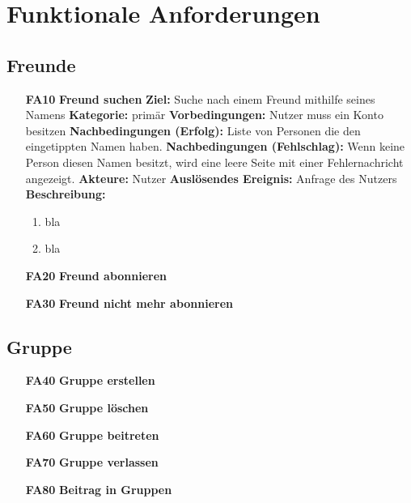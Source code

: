 \documentclass[parskip=full]{scrartcl}
\begin{document}
	
	\section{Funktionale Anforderungen}
		\subsection{Freunde}
		\begin{itemize}[itemsep=0pt]
			\item[\textbf{FA10}]\textbf{Freund suchen}
			\newline\newline \textbf{Ziel:} Suche nach einem Freund mithilfe seines Namens
			\newline\newline \textbf{Kategorie:} primär
			\newline\newline \textbf{Vorbedingungen:} Nutzer muss ein Konto besitzen
			\newline\newline \textbf{Nachbedingungen (Erfolg):} Liste von Personen die den eingetippten Namen haben.
			\newline\newline \textbf{Nachbedingungen (Fehlschlag):}  Wenn keine Person diesen Namen besitzt, wird eine leere Seite mit einer Fehlernachricht angezeigt.
			\newline\newline \textbf{Akteure:} Nutzer
			\newline\newline \textbf{Auslösendes Ereignis:} Anfrage des Nutzers
			\newline\newline \textbf{Beschreibung:}
				\begin{enumerate}[nosep]
					\item bla 
					\item bla\\
				\end{enumerate}
			
			\item[\textbf{\large FA20}]\textbf{\large Freund abonnieren}
			\item[\textbf{\large FA30}]\textbf{\large Freund nicht mehr abonnieren}
		\end{itemize}
		
		\subsection{Gruppe}
		\begin{itemize}[nosep]
			\item[\textbf{FA40}]\textbf{Gruppe erstellen}
			\item[\textbf{FA50}]\textbf{Gruppe löschen}
			\item[\textbf{FA60}]\textbf{Gruppe beitreten}
			\item[\textbf{FA70}]\textbf{Gruppe verlassen}
			\item[\textbf{FA80}]\textbf{Beitrag in Gruppen}
		\end{itemize}
		
\end{document}
